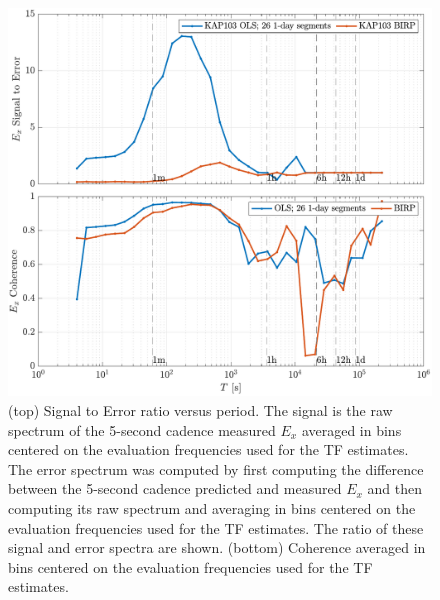 \documentclass{article}
\begin{document}
\begin{figure}[h!]
\centering
\includegraphics[width=\textwidth]{figures/KAP103/SN_compare-E_x.pdf}
\caption{(top) Signal to Error ratio versus period. The signal is the raw spectrum of the 5-second cadence measured $E_x$ averaged in bins centered on the evaluation frequencies used for the TF estimates. The error spectrum was computed by first computing the difference between the 5-second cadence predicted and measured $E_x$ and then computing its raw spectrum and averaging in bins centered on the evaluation frequencies used for the TF estimates. The ratio of these signal and error spectra are shown. (bottom) Coherence averaged in bins centered on the evaluation frequencies used for the TF estimates.}
\label{fig:universe}
\end{figure}

\clearpage
\end{document}
